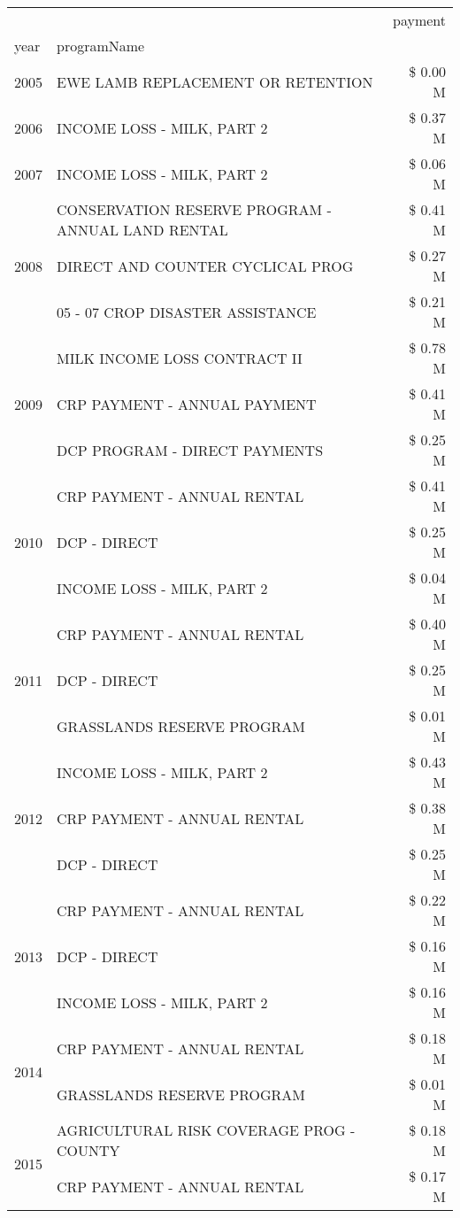 \begin{tabular}{llr}
\toprule
 &  & payment \\
year & programName &  \\
\midrule
2005 & EWE LAMB REPLACEMENT OR RETENTION & \$ 0.00 M \\
\cline{1-3}
2006 & INCOME LOSS - MILK, PART 2 & \$ 0.37 M \\
\cline{1-3}
2007 & INCOME LOSS - MILK, PART 2 & \$ 0.06 M \\
\cline{1-3}
\multirow[t]{3}{*}{2008} & CONSERVATION RESERVE PROGRAM - ANNUAL LAND RENTAL & \$ 0.41 M \\
 & DIRECT AND COUNTER CYCLICAL PROG & \$ 0.27 M \\
 & 05 - 07 CROP DISASTER ASSISTANCE & \$ 0.21 M \\
\cline{1-3}
\multirow[t]{3}{*}{2009} & MILK INCOME LOSS CONTRACT II & \$ 0.78 M \\
 & CRP PAYMENT - ANNUAL PAYMENT & \$ 0.41 M \\
 & DCP PROGRAM - DIRECT PAYMENTS & \$ 0.25 M \\
\cline{1-3}
\multirow[t]{3}{*}{2010} & CRP PAYMENT - ANNUAL RENTAL & \$ 0.41 M \\
 & DCP - DIRECT & \$ 0.25 M \\
 & INCOME LOSS - MILK, PART 2 & \$ 0.04 M \\
\cline{1-3}
\multirow[t]{3}{*}{2011} & CRP PAYMENT - ANNUAL RENTAL & \$ 0.40 M \\
 & DCP - DIRECT & \$ 0.25 M \\
 & GRASSLANDS RESERVE PROGRAM & \$ 0.01 M \\
\cline{1-3}
\multirow[t]{3}{*}{2012} & INCOME LOSS - MILK, PART 2 & \$ 0.43 M \\
 & CRP PAYMENT - ANNUAL RENTAL & \$ 0.38 M \\
 & DCP - DIRECT & \$ 0.25 M \\
\cline{1-3}
\multirow[t]{3}{*}{2013} & CRP PAYMENT - ANNUAL RENTAL & \$ 0.22 M \\
 & DCP - DIRECT & \$ 0.16 M \\
 & INCOME LOSS - MILK, PART 2 & \$ 0.16 M \\
\cline{1-3}
\multirow[t]{2}{*}{2014} & CRP PAYMENT - ANNUAL RENTAL & \$ 0.18 M \\
 & GRASSLANDS RESERVE PROGRAM & \$ 0.01 M \\
\cline{1-3}
\multirow[t]{3}{*}{2015} & AGRICULTURAL RISK COVERAGE PROG - COUNTY & \$ 0.18 M \\
 & CRP PAYMENT - ANNUAL RENTAL & \$ 0.17 M \\

\end{tabular}
